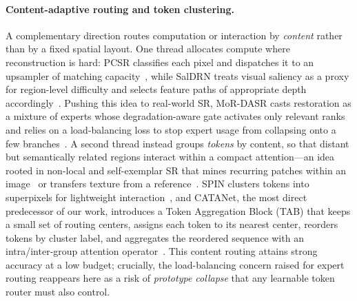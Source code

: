 \paragraph{Content-adaptive routing and token clustering.}
A complementary direction routes computation or interaction by \emph{content}
rather than by a fixed spatial layout. One thread allocates compute where
reconstruction is hard: PCSR classifies each pixel and dispatches it to an
upsampler of matching capacity~\cite{jeong2024pcsr}, while SalDRN treats visual
saliency as a proxy for region-level difficulty and selects feature paths of
appropriate depth accordingly~\cite{wu2023saldrn}. Pushing this idea to
real-world SR, MoR-DASR casts restoration as a mixture of experts whose
degradation-aware gate activates only relevant ranks and relies on a
load-balancing loss to stop expert usage from collapsing onto a few
branches~\cite{he2026mordasr}. A second thread instead groups \emph{tokens} by
content, so that distant but semantically related regions interact within a
compact attention---an idea rooted in non-local and self-exemplar SR that mines
recurring patches within an image~\cite{mei2020csnln} or transfers texture from a
reference~\cite{yang2020ttn}. SPIN clusters tokens into superpixels for
lightweight interaction~\cite{zhang2024spin}, and CATANet, the most direct
predecessor of our work, introduces a Token Aggregation Block (TAB) that keeps a
small set of routing centers, assigns each token to its nearest center, reorders
tokens by cluster label, and aggregates the reordered sequence with an
intra/inter-group attention operator~\cite{liu2025catanet}. This content routing
attains strong accuracy at a low budget; crucially, the load-balancing concern
raised for expert routing reappears here as a risk of \emph{prototype collapse}
that any learnable token router must also control.

